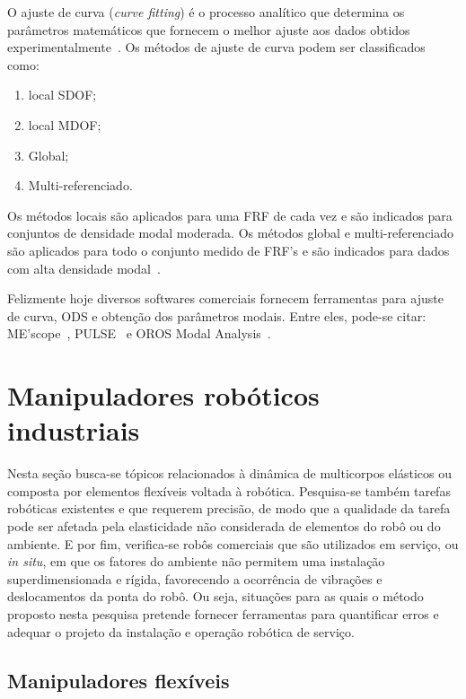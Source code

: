 O ajuste de curva (\textit{curve fitting}) é o processo analítico que determina
os parâmetros matemáticos que fornecem o melhor ajuste aos dados
obtidos experimentalmente~\cite{dossing1988structural}.
Os métodos de ajuste de curva podem ser classificados como: 
%
\begin{enumerate}[label=\emph{\alph*})]
	\item local SDOF;
	\item local MDOF;
	\item Global;
	\item Multi-referenciado.
\end{enumerate}
%
Os métodos locais são aplicados para uma FRF de cada vez e são indicados para
conjuntos de densidade modal moderada. Os métodos global e multi-referenciado
são aplicados para todo o conjunto medido de FRF's e são indicados para dados
com alta densidade modal~\cite{schwarz1999experimental}. 

Felizmente hoje diversos softwares comerciais fornecem ferramentas para ajuste
de curva, ODS e obtenção dos parâmetros modais. Entre eles, pode-se citar:
ME'scope~\cite{mescope}, PULSE~\cite{pulse} e OROS Modal Analysis~\cite{oros}. 


\section{Manipuladores robóticos industriais}\label{sec::manind}
Nesta seção busca-se tópicos relacionados à dinâmica de multicorpos elásticos ou
composta por elementos flexíveis voltada à robótica. Pesquisa-se também tarefas
robóticas existentes e que requerem precisão, de modo que a qualidade da tarefa
pode ser afetada pela elasticidade não considerada de elementos do robô ou do
ambiente.
E por fim, verifica-se robôs comerciais que são utilizados em serviço, ou
\textit{in situ}, em que os fatores do ambiente não permitem uma instalação
superdimensionada e rígida, favorecendo a ocorrência de vibrações e
deslocamentos da ponta do robô. Ou seja, situações para as quais o método
proposto nesta pesquisa pretende fornecer ferramentas para quantificar erros e
adequar o projeto da instalação e operação robótica de serviço.

\subsection{Manipuladores flexíveis}



